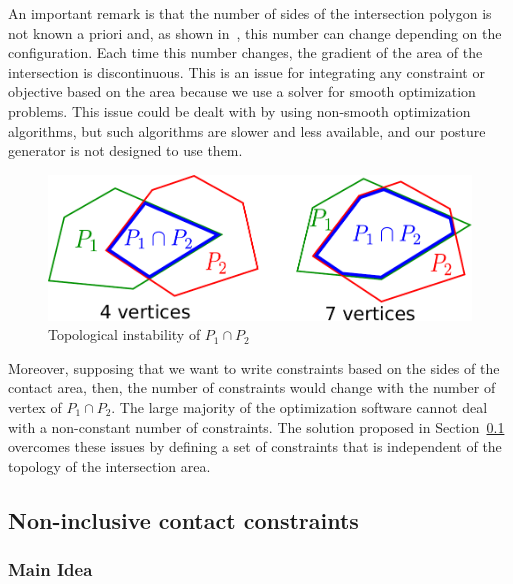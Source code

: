An important remark is that the number of sides of the intersection polygon is not known a priori and, as shown in~, this number can change depending on the configuration.
Each time this number changes, the gradient of the area of the intersection is discontinuous.
This is an issue for integrating any constraint or objective based on the area because we use a solver for smooth optimization problems.
This issue could be dealt with by using non-smooth optimization algorithms, but such algorithms are slower and less available, and our posture generator is not designed to use them.
\begin{figure}[!htb]
  \centering
  \includegraphics[width=0.4\columnwidth]{polygon-inter.pdf}
  \caption{Topological instability of $P_1 \cap P_2$}
\label{fig:polygon-inter}
\end{figure}
Moreover, supposing that we want to write constraints based on the sides of the contact area, then, the number of constraints would change with the number of vertex of $P_1 \cap P_2$.
The large majority of the optimization software cannot deal with a non-constant number of constraints.
The solution proposed in Section~\ref{subsec:ellipse} overcomes these issues by defining a set of constraints that is independent of the topology of the intersection area.



\subsection{Non-inclusive contact constraints}
\label{subsec:ellipse}




\subsubsection{Main Idea}
\label{subsubsec:idea}


